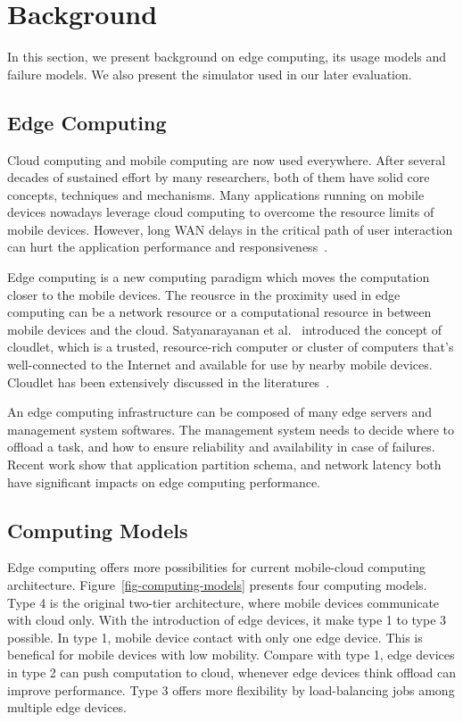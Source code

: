 \section{Background}
\label{sec:background}

In this section, we present background on edge computing, its usage models and failure models.
We also present the simulator used in our later evaluation.

\subsection{Edge Computing}
Cloud computing and mobile computing are now used everywhere.
After several decades of sustained effort by many researchers, both of them have
solid core concepts, techniques and mechanisms. Many applications running on mobile devices nowadays
leverage cloud computing to overcome the resource limits of mobile devices. However,
long WAN delays in the critical path of user interaction can hurt the application
performance and responsiveness~\cite{cloudlets09}.

Edge computing is a new computing paradigm which moves the computation closer to the mobile devices.
The reousrce in the proximity used in edge computing can be a network resource or a computational resource
in between mobile devices and the cloud. Satyanarayanan et al.~\cite{cloudlets09} introduced the concept
of cloudlet, which is a trusted, resource-rich computer or cluster of computers that's well-connected to
the Internet and available for use by nearby mobile devices. Cloudlet has been extensively discussed in the
literatures~\cite{edge-computing, Cloudlets12,hu-apsys16,ChaufournierSLN17}.

An edge computing infrastructure can be composed of many edge servers and management system softwares.
The management system needs to decide where to offload a task, and how to ensure reliability and availability
in case of failures. Recent work \cite{hu-apsys16,COMET} show that application partition schema, and network latency
both have significant impacts on edge computing performance.


\subsection{Computing Models}
\label{sec:usage-models}
Edge computing offers more possibilities for current mobile-cloud computing architecture.
Figure~\ref{fig-computing-models} presents four computing models. Type 4 is the original
two-tier architecture, where mobile devices communicate with cloud only. With the introduction of
edge devices, it make type 1 to type 3 possible. In type 1, mobile device contact with only one edge device.
This is benefical for mobile devices with low mobility. Compare with type 1, edge devices in type 2 can
push computation to cloud, whenever edge devices think offload can improve performance. Type 3 offers
more flexibility by load-balancing jobs among multiple edge devices.

